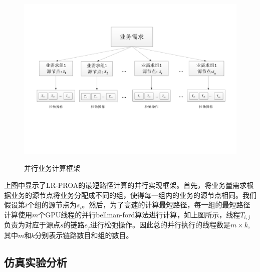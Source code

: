 \begin{figure}
\setlength{\belowcaptionskip}{-0.5cm}
  \begin{center}
    {\includegraphics[width=1 \textwidth]{figures/paframework.pdf}}
    \end{center}
  \caption{{\footnotesize{并行业务计算框架}}}
  \label{ParFramework}
\end{figure}
  上图中显示了LR-PROA的最短路径计算的并行实现框架。首先，将业务量需求根据业务的源节点将业务分配成不同的组，使得每一组内的业务的源节点相同。我们假设第$i$个组的源节点为$s_i$。然后，为了高速的计算最短路径，每一组的最短路径计算使用$m$个GPU线程的并行bellman-ford算法进行计算，如上图所示，线程$T_{i,j}$负责为对应于源点$s$的链路$e_{j}$进行松弛操作。因此总的并行执行的线程数是$m \times k$,其中$m$和$k$分别表示链路数目和组的数目。
\subsection{仿真实验分析}
